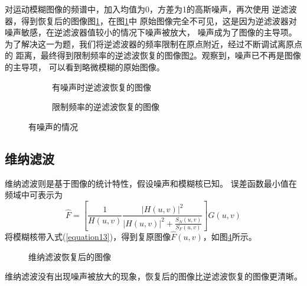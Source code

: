 \documentclass[UTF8]{article}
\begin{document}
对运动模糊图像的频谱中，加入均值为0，方差为1的高斯噪声，再次使用
逆滤波器，得到恢复后的图像图\ref{fig:inverse_filter2}，在图\ref{fig:inverse_filter2}中
原始图像完全不可见，这是因为逆滤波器对噪声敏感，在逆滤波器值较小的情况下噪声被放大，
噪声成为了图像的主导项。为了解决这一为题，我们将逆滤波器的频率限制在原点附近，经过不断调试离原点的
距离，最终得到限制频率的逆滤波恢复的图像图\ref{fig:inverse_filter3}。观察到，噪声已不再是图像的主导项，
可以看到略微模糊的原始图像。
\begin{figure}[htbp]
    \centering
    \begin{subfigure}{0.45\textwidth}
      \centering
      
      \caption{有噪声时逆滤波恢复的图像}
      \label{fig:inverse_filter2}
    \end{subfigure}
    \begin{subfigure}{0.45\textwidth}
      \centering
      
      \caption{限制频率的逆滤波恢复的图像}
      \label{fig:inverse_filter3} 
    \end{subfigure}
    \caption{有噪声的情况}
    \label{fig:inputs} 
\end{figure}
\subsection{维纳滤波}
维纳滤波则是基于图像的统计特性，假设噪声和模糊核已知。
误差函数最小值在频域中可表示为
\begin{equation}
    \hat{F} = [\frac{1}{H(u,v)}\frac{|H(u,v)|^2}{|H(u,v)|^2+ \frac{S_N(u,v)}{S_F(u,v)}}]G(u,v)
    \label{equation13}
\end{equation}
将模糊核带入式(\ref{equation13})，得到复原图像$\hat{F}(u,v)$，如图\ref{fig:wiener_filter}所示。
\begin{figure}[htbp]
    \centering
    
    \caption{维纳滤波恢复后的图像}
    \label{fig:wiener_filter}
\end{figure}
维纳滤波没有出现噪声被放大的现象，恢复后的图像比逆滤波恢复的图像更清晰。
\end{document}
